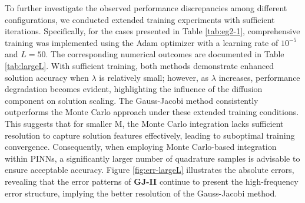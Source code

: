 \documentclass[preprint,3p,times]{elsarticle}
\begin{document}
To further investigate the observed performance discrepancies among different configurations, we conducted extended training experiments with sufficient iterations. Specifically, for the cases presented in Table \ref{tab:eg2-1}, comprehensive training was implemented using the Adam optimizer with a learning rate of $10^{-5}$ and $L=50$. The corresponding numerical outcomes are documented in Table \ref{tab:largeL}. With sufficient training, both methods demonstrate enhanced solution accuracy when $\lambda$ is relatively small; however, as $\lambda$ increases, performance degradation becomes evident, highlighting the influence of the diffusion component on solution scaling. The Gauss-Jacobi method consistently outperforms the Monte Carlo approach under these extended training conditions. This suggests that for smaller M, the Monte Carlo integration lacks sufficient resolution to capture solution features effectively, leading to suboptimal training convergence. Consequently, when employing Monte Carlo-based integration within PINNs, a significantly larger number of quadrature samples is advisable to ensure acceptable accuracy. Figure \ref{fig:err-largeL} illustrates the absolute errors, revealing that the error patterns of \textbf{GJ-II} continue to present the high-frequency error structure, implying the better resolution of the Gauss-Jacobi method. 
\end{document}
